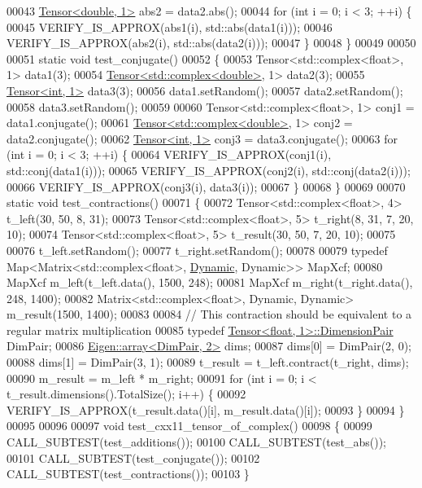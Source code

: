 \begin{DoxyCode}
00043   \hyperlink{class_eigen_1_1_tensor}{Tensor<double, 1>} abs2 = data2.abs();
00044   \textcolor{keywordflow}{for} (\textcolor{keywordtype}{int} i = 0; i < 3; ++i) \{
00045     VERIFY\_IS\_APPROX(abs1(i), std::abs(data1(i)));
00046     VERIFY\_IS\_APPROX(abs2(i), std::abs(data2(i)));
00047   \}
00048 \}
00049 
00050 
00051 \textcolor{keyword}{static} \textcolor{keywordtype}{void} test\_conjugate()
00052 \{
00053   Tensor<std::complex<float>, 1> data1(3);
00054   \hyperlink{class_eigen_1_1_tensor}{Tensor<std::complex<double>}, 1> data2(3);
00055   \hyperlink{class_eigen_1_1_tensor}{Tensor<int, 1>} data3(3);
00056   data1.setRandom();
00057   data2.setRandom();
00058   data3.setRandom();
00059 
00060   Tensor<std::complex<float>, 1> conj1 = data1.conjugate();
00061   \hyperlink{class_eigen_1_1_tensor}{Tensor<std::complex<double>}, 1> conj2 = data2.conjugate();
00062   \hyperlink{class_eigen_1_1_tensor}{Tensor<int, 1>} conj3 = data3.conjugate();
00063   \textcolor{keywordflow}{for} (\textcolor{keywordtype}{int} i = 0; i < 3; ++i) \{
00064     VERIFY\_IS\_APPROX(conj1(i), std::conj(data1(i)));
00065     VERIFY\_IS\_APPROX(conj2(i), std::conj(data2(i)));
00066     VERIFY\_IS\_APPROX(conj3(i), data3(i));
00067   \}
00068 \}
00069 
00070 \textcolor{keyword}{static} \textcolor{keywordtype}{void} test\_contractions()
00071 \{
00072   Tensor<std::complex<float>, 4> t\_left(30, 50, 8, 31);
00073   Tensor<std::complex<float>, 5> t\_right(8, 31, 7, 20, 10);
00074   Tensor<std::complex<float>, 5> t\_result(30, 50, 7, 20, 10);
00075 
00076   t\_left.setRandom();
00077   t\_right.setRandom();
00078 
00079   \textcolor{keyword}{typedef} Map<Matrix<std::complex<float>, \hyperlink{namespace_eigen_ad81fa7195215a0ce30017dfac309f0b2}{Dynamic}, Dynamic>> MapXcf;
00080   MapXcf m\_left(t\_left.data(), 1500, 248);
00081   MapXcf m\_right(t\_right.data(), 248, 1400);
00082   Matrix<std::complex<float>, Dynamic, Dynamic> m\_result(1500, 1400);
00083 
00084   \textcolor{comment}{// This contraction should be equivalent to a regular matrix multiplication}
00085   \textcolor{keyword}{typedef} \hyperlink{class_eigen_1_1_tensor}{Tensor<float, 1>::DimensionPair} DimPair;
00086   \hyperlink{class_eigen_1_1array}{Eigen::array<DimPair, 2>} dims;
00087   dims[0] = DimPair(2, 0);
00088   dims[1] = DimPair(3, 1);
00089   t\_result = t\_left.contract(t\_right, dims);
00090   m\_result = m\_left * m\_right;
00091   \textcolor{keywordflow}{for} (\textcolor{keywordtype}{int} i = 0; i < t\_result.dimensions().TotalSize(); i++) \{
00092     VERIFY\_IS\_APPROX(t\_result.data()[i], m\_result.data()[i]);
00093   \}
00094 \}
00095 
00096 
00097 \textcolor{keywordtype}{void} test\_cxx11\_tensor\_of\_complex()
00098 \{
00099   CALL\_SUBTEST(test\_additions());
00100   CALL\_SUBTEST(test\_abs());
00101   CALL\_SUBTEST(test\_conjugate());
00102   CALL\_SUBTEST(test\_contractions());
00103 \}
\end{DoxyCode}
